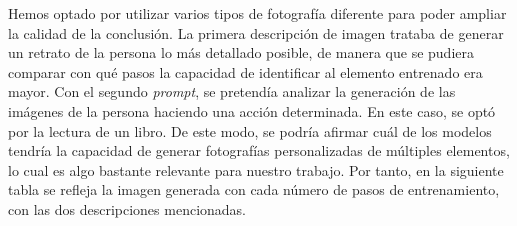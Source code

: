 Hemos optado por utilizar varios tipos de fotografía diferente para poder ampliar la calidad de la conclusión. La primera descripción de imagen trataba de generar un retrato de la persona lo más detallado posible, de manera que se pudiera comparar con qué pasos la capacidad de identificar al elemento entrenado era mayor. Con el segundo \textit{prompt}, se pretendía analizar la generación de las imágenes de la persona haciendo una acción determinada. En este caso, se optó por la lectura de un libro. De este modo, se podría afirmar cuál de los modelos tendría la capacidad de generar fotografías personalizadas de múltiples elementos, lo cual es algo bastante relevante para nuestro trabajo. Por tanto, en la siguiente tabla se refleja la imagen generada con cada número de pasos de entrenamiento, con las dos descripciones mencionadas.\\


